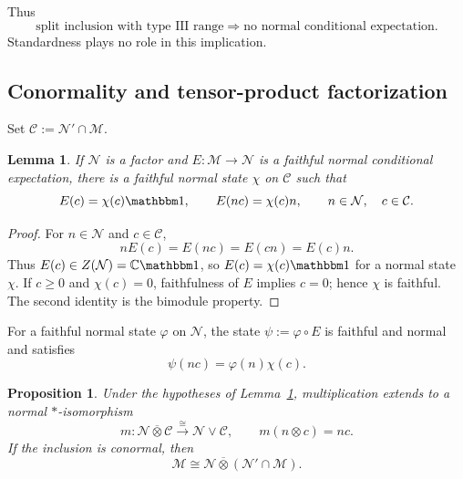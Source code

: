 \documentclass[a4paper,11pt]{article}
\newtheorem{lemma}[theorem]{Lemma}
\newtheorem{proposition}[theorem]{Proposition}
\theoremstyle{definition}
\begin{document}
Thus
\begin{equation}
 \boxed{\text{split inclusion with type III range}
 \Longrightarrow\text{no normal conditional expectation}.}
\end{equation}
Standardness plays no role in this implication.

\subsection{Conormality and tensor-product factorization}

Set $\mathcal C:=\mathcal N'\cap\mathcal M$.

\begin{lemma}\label{lem:expectation-slice}
If $\mathcal N$ is a factor and $E:\mathcal M\to\mathcal N$ is a faithful
normal conditional expectation, there is a faithful normal state $\chi$ on
$\mathcal C$ such that
\begin{equation}
 E(c)=\chi(c)\mathbbm 1,
 \qquad E(nc)=\chi(c)n,
 \qquad n\in\mathcal N,\quad c\in\mathcal C.
\end{equation}
\end{lemma}

\begin{proof}
For $n\in\mathcal N$ and $c\in\mathcal C$,
\begin{equation}
 nE(c)=E(nc)=E(cn)=E(c)n.
\end{equation}
Thus $E(c)\in Z(\mathcal N)=\mathbb C\mathbbm 1$, so
$E(c)=\chi(c)\mathbbm 1$ for a normal state $\chi$.  If $c\geq0$ and
$\chi(c)=0$, faithfulness of $E$ implies $c=0$; hence $\chi$ is faithful.  The
second identity is the bimodule property.
\end{proof}

For a faithful normal state $\varphi$ on $\mathcal N$, the state
$\psi:=\varphi\circ E$ is faithful and normal and satisfies
\begin{equation}
 \psi(nc)=\varphi(n)\chi(c).
\end{equation}

\begin{proposition}\label{prop:conormal-factorization}
Under the hypotheses of Lemma~\ref{lem:expectation-slice}, multiplication
extends to a normal $*$-isomorphism
\begin{equation}
 m:\mathcal N\overline\otimes\mathcal C
 \overset{\cong}{\longrightarrow}\mathcal N\vee\mathcal C,
 \qquad m(n\otimes c)=nc.
\end{equation}
If the inclusion is conormal, then
\begin{equation}\label{eq:conormal-factorization}
 \boxed{\mathcal M\cong
 \mathcal N\overline\otimes(\mathcal N'\cap\mathcal M).}
\end{equation}
\end{proposition}
\end{document}
